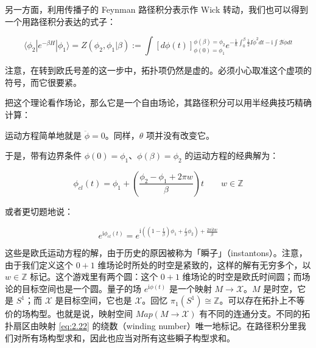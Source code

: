 
另一方面，利用传播子的 Feynman 路径积分表示作 Wick 转动，我们也可以得到一个用路径积分表达的式子：

\begin{equation}
  \langle\phi_2|e^{-\beta H}|\phi_1\rangle=Z(\phi_2,\phi_1|\beta):=\int[d\phi(t)]_{\phi(0)=\phi_1}^{\phi(\beta)=\phi_2}e^{-\frac{1}{\hbar}\int_0^{\beta}\frac{1}{2}I\dot\phi^{2}dt-\mathrm{i}\int\mathcal{B}\dot\phi dt}
  \tag{2.20}
  \label{eq:2.20}
\end{equation}

注意，在转到欧氏号差的这一步中，拓扑项仍然是虚的。必须小心取准这个虚项的符号，而它很要紧。

把这个理论看作场论，那么它是一个自由场论，其路径积分可以用半经典技巧精确计算：

运动方程简单地就是 $\ddot\phi=0$。同样，$\theta$ 项并没有改变它。

于是，带有边界条件 $\phi(0)=\phi_1$、$\phi(\beta)=\phi_2$ 的运动方程的经典解为：

\begin{equation}
  \phi_{cl}(t)=\phi_1+\left(\frac{\phi_2-\phi_1+2\pi w}{\beta}\right)t
  \qquad w\in\mathbb{Z}
  \tag{2.21}
  \label{eq:2.21}
\end{equation}

或者更切题地说：

\begin{equation}
  e^{\mathrm{i}\phi_{cl}(t)}=e^{\mathrm{i}\left(\left(1-\frac{t}{\beta}\right)\phi_1+\frac{t}{\beta}\phi_2\right)+\frac{2\pi\mathrm{i}tw}{\beta}}
  \tag{2.22}
  \label{eq:2.22}
\end{equation}

这些是欧氏运动方程的解，由于历史的原因被称为「瞬子」（instantons）。注意，由于我们定义这个 $0+1$ 维场论时所处的时空是紧致的，这样的解有无穷多个，以 $w\in\mathbb{Z}$ 标记。这个游戏里有两个圆：这个 $0+1$ 维场论的时空是欧氏时间圆；而场论的目标空间也是一个圆。量子的场 $e^{\mathrm{i}\phi(t)}$ 是一个映射 $M\to\mathcal{X}$。$M$ 是时空，它是 $S^{1}$；而 $\mathcal{X}$ 是目标空间，它也是 $\mathcal{X}$。回忆 $\pi_1(S^{1})\cong\mathbb{Z}$。可以存在拓扑上不等价的场构型。也就是说，映射空间 $Map(M\to\mathcal{X})$ 有不同的连通分支。不同的拓扑扇区由映射 \eqref{eq:2.22} 的绕数（winding number）唯一地标记。在路径积分里我们对所有场构型求和，因此也应当对所有这些瞬子构型求和。

